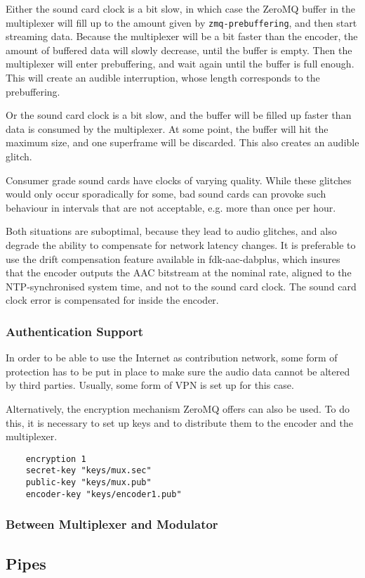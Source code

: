 Either the sound card clock is a bit slow, in which case the ZeroMQ buffer in the multiplexer will
fill up to the amount given by \texttt{zmq-prebuffering}, and then start streaming data. Because the
multiplexer will be a bit faster than the encoder, the amount of buffered data will slowly decrease,
until the buffer is empty. Then the multiplexer will enter prebuffering, and wait again until the
buffer is full enough. This will create an audible interruption, whose length corresponds to the
prebuffering.

Or the sound card clock is a bit slow, and the buffer will be filled up faster than data is consumed
by the multiplexer. At some point, the buffer will hit the maximum size, and one superframe will be
discarded. This also creates an audible glitch.

Consumer grade sound cards have clocks of varying quality. While these glitches would only occur
sporadically for some, bad sound cards can provoke such behaviour in intervals that are not
acceptable, e.g. more than once per hour.

Both situations are suboptimal, because they lead to audio glitches, and also degrade the ability to
compensate for network latency changes. It is preferable to use the drift compensation feature
available in fdk-aac-dabplus, which insures that the encoder outputs the AAC bitstream at the
nominal rate, aligned to the NTP-synchronised system time, and not to the sound card clock. The
sound card clock error is compensated for inside the encoder.



\subsubsection{Authentication Support}
In order to be able to use the Internet as contribution network, some form of protection has to be
put in place to make sure the audio data cannot be altered by third parties. Usually, some form of
VPN is set up for this case.

Alternatively, the encryption mechanism ZeroMQ offers can also be used. To do this, it is necessary
to set up keys and to distribute them to the encoder and the multiplexer.

\begin{lstlisting}
    encryption 1
    secret-key "keys/mux.sec"
    public-key "keys/mux.pub"
    encoder-key "keys/encoder1.pub"
\end{lstlisting}


\subsubsection{Between Multiplexer and Modulator}

\subsection{Pipes}
